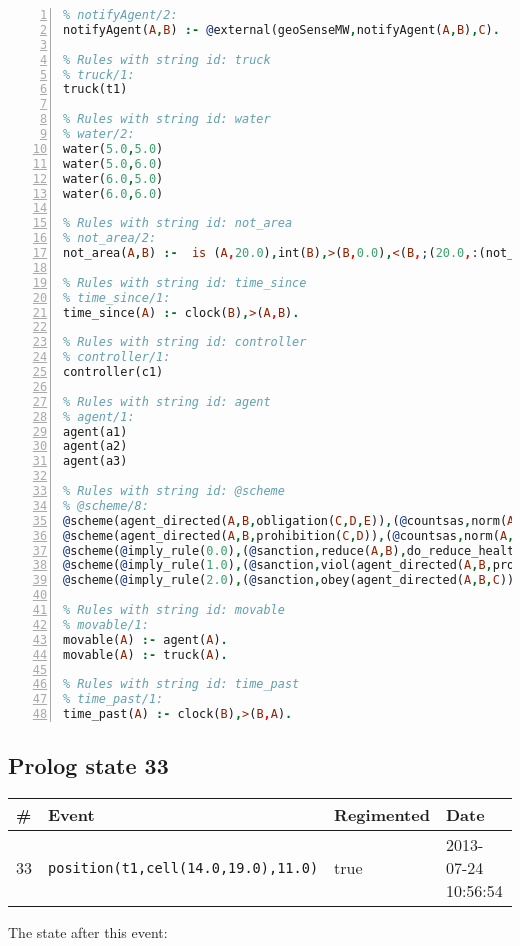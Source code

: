 \documentclass[11pt]{article}\usepackage[utf8]{inputenc}\usepackage{geometry}
\begin{document}
\begin{lstlisting}[language=Prolog, numbers=left]
% Rules with string id: notifyAgent
% notifyAgent/2:
notifyAgent(A,B) :- @external(geoSenseMW,notifyAgent(A,B),C).

% Rules with string id: truck
% truck/1:
truck(t1)

% Rules with string id: water
% water/2:
water(5.0,5.0)
water(5.0,6.0)
water(6.0,5.0)
water(6.0,6.0)

% Rules with string id: not_area
% not_area/2:
not_area(A,B) :-  is (A,20.0),int(B),>(B,0.0),<(B,;(20.0,:(not_area(A,B), is (-(B),20.0)))),int(A),>(A,0.0),<(A,;(20.0,:(area(A,B),-(int(A))))),int(B),>(A,0.0),>(B,0.0),<(A,21.0),<(B,21.0).

% Rules with string id: time_since
% time_since/1:
time_since(A) :- clock(B),>(A,B).

% Rules with string id: controller
% controller/1:
controller(c1)

% Rules with string id: agent
% agent/1:
agent(a1)
agent(a2)
agent(a3)

% Rules with string id: @scheme
% @scheme/8:
@scheme(agent_directed(A,B,obligation(C,D,E)),(@countsas,norm(A,B,F,obligation(C,D,E)),F),false,(listTrue(C)),(time_past(D)),false,[plus(viol(agent_directed(A,B,obligation(C,D,E))))|[]],[plus(obey(agent_directed(A,B,obligation(C,D,E))))|[]])
@scheme(agent_directed(A,B,prohibition(C,D)),(@countsas,norm(A,B,E,prohibition(C,D)),E),(listTrue(C)),false,(false),false,[plus(viol(agent_directed(A,B,prohibition(C,D))))|[]],[plus(obey(agent_directed(A,B,prohibition(C,D))))|[]])
@scheme(@imply_rule(0.0),(@sanction,reduce(A,B),do_reduce_health(A,B),notifyAgent(A,changed(status))),true,false,false,false,[min(reduce(A,B))|[]],[])
@scheme(@imply_rule(1.0),(@sanction,viol(agent_directed(A,B,prohibition(C,D))),do_sanction(D)),true,false,false,false,[min(viol(agent_directed(A,B,prohibition(C,D))))|[]],[])
@scheme(@imply_rule(2.0),(@sanction,obey(agent_directed(A,B,C))),true,false,false,false,[min(obey(agent_directed(A,B,C)))|[]],[])

% Rules with string id: movable
% movable/1:
movable(A) :- agent(A).
movable(A) :- truck(A).

% Rules with string id: time_past
% time_past/1:
time_past(A) :- clock(B),>(B,A).

\end{lstlisting}
\clearpage 
\subsection{Prolog state 33}
\begin{table}[ht]
\centering 
\begin{tabular}{l l l l} 
\textbf{\#} & \textbf{Event} & \textbf{Regimented} & \textbf{Date} \\ [0.5ex] 
\hline
33&\texttt{position(t1,cell(14.0,19.0),11.0)}&true&2013-07-24 10:56:54\\ [1ex] \hline\end{tabular}
\end{table}
The state after this event:
\end{document}
